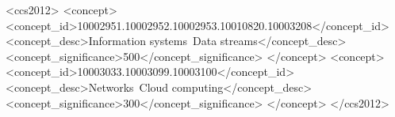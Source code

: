 
\begin{CCSXML}
<ccs2012>
<concept>
<concept_id>10002951.10002952.10002953.10010820.10003208</concept_id>
<concept_desc>Information systems~Data streams</concept_desc>
<concept_significance>500</concept_significance>
</concept>
<concept>
<concept_id>10003033.10003099.10003100</concept_id>
<concept_desc>Networks~Cloud computing</concept_desc>
<concept_significance>300</concept_significance>
</concept>
</ccs2012>
\end{CCSXML}

%
\printccsdesc


